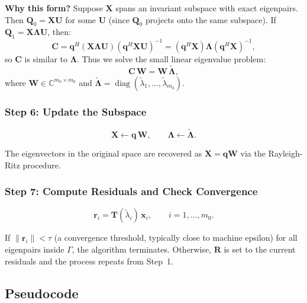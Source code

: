 \documentclass[12pt,a4paper]{article}
\theoremstyle{definition}
\DeclareMathOperator{\diag}{diag}
\begin{document}
\textbf{Why this form?} Suppose $\mathbf{X}$ spans an invariant subspace with exact eigenpairs. Then $\mathbf{Q}_0 = \mathbf{X}\mathbf{U}$ for some $\mathbf{U}$ (since $\mathbf{Q}_0$ projects onto the same subspace). If $\mathbf{Q}_1 = \mathbf{X}\mathbf{\Lambda}\mathbf{U}$, then:
\begin{equation}
\mathbf{C} = \mathbf{q}^{H}(\mathbf{X}\mathbf{\Lambda}\mathbf{U})(\mathbf{q}^{H}\mathbf{X}\mathbf{U})^{-1}
= (\mathbf{q}^{H}\mathbf{X})\mathbf{\Lambda}(\mathbf{q}^{H}\mathbf{X})^{-1},
\end{equation}
so $\mathbf{C}$ is similar to $\mathbf{\Lambda}$. Thus we solve the small linear eigenvalue problem:
\begin{equation}\label{eq:reduced_evp}
\boxed{\mathbf{C}\,\mathbf{W} = \mathbf{W}\,\tilde{\mathbf{\Lambda}}},
\end{equation}
where $\mathbf{W} \in \mathbb{C}^{m_0 \times m_0}$ and $\tilde{\mathbf{\Lambda}} = \diag(\tilde{\lambda}_1, \ldots, \tilde{\lambda}_{m_0})$.

\subsubsection*{Step 6: Update the Subspace}

\begin{equation}\label{eq:update}
\mathbf{X} \leftarrow \mathbf{q}\,\mathbf{W}, \qquad \mathbf{\Lambda} \leftarrow \tilde{\mathbf{\Lambda}}.
\end{equation}

The eigenvectors in the original space are recovered as $\mathbf{X} = \mathbf{q}\mathbf{W}$ via the Rayleigh-Ritz procedure.

\subsubsection*{Step 7: Compute Residuals and Check Convergence}

\begin{equation}\label{eq:residual}
\mathbf{r}_i = \mathbf{T}(\tilde{\lambda}_i)\,\mathbf{x}_i, \qquad i = 1, \ldots, m_0.
\end{equation}

If $\|\mathbf{r}_i\| < \tau$ (a convergence threshold, typically close to machine epsilon) for all eigenpairs inside $\Gamma$, the algorithm terminates. Otherwise, $\mathbf{R}$ is set to the current residuals and the process repeats from Step~1.

\subsection{Pseudocode}
\end{document}
